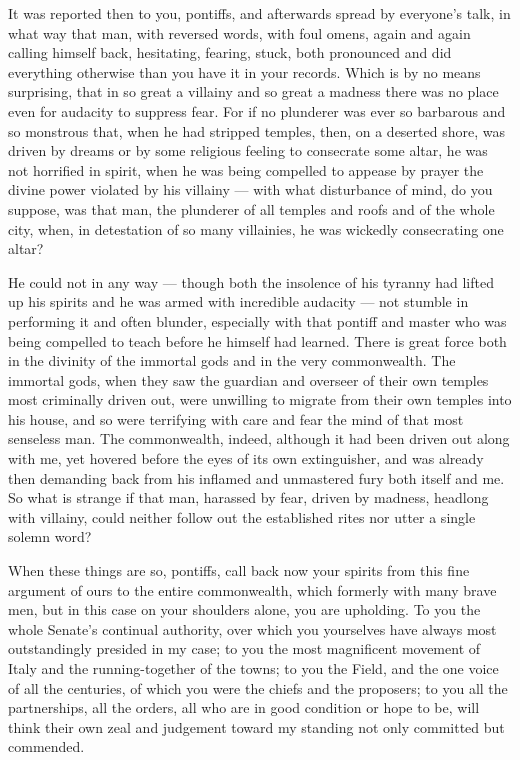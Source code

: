  It was reported then to you, pontiffs, and afterwards spread by everyone's talk, in what way that man, with reversed words, with foul omens, again and again calling himself back, hesitating, fearing, stuck, both pronounced and did everything otherwise than you have it in your records. Which is by no means surprising, that in so great a villainy and so great a madness there was no place even for audacity to suppress fear. For if no plunderer was ever so barbarous and so monstrous that, when he had stripped temples, then, on a deserted shore, was driven by dreams or by some religious feeling to consecrate some altar, he was not horrified in spirit, when he was being compelled to appease by prayer the divine power violated by his villainy --- with what disturbance of mind, do you suppose, was that man, the plunderer of all temples and roofs and of the whole city, when, in detestation of so many villainies, he was wickedly consecrating one altar?

 He could not in any way --- though both the insolence of his tyranny had lifted up his spirits and he was armed with incredible audacity --- not stumble in performing it and often blunder, especially with that pontiff and master who was being compelled to teach before he himself had learned. There is great force both in the divinity of the immortal gods and in the very commonwealth. The immortal gods, when they saw the guardian and overseer of their own temples most criminally driven out, were unwilling to migrate from their own temples into his house, and so were terrifying with care and fear the mind of that most senseless man. The commonwealth, indeed, although it had been driven out along with me, yet hovered before the eyes of its own extinguisher, and was already then demanding back from his inflamed and unmastered fury both itself and me. So what is strange if that man, harassed by fear, driven by madness, headlong with villainy, could neither follow out the established rites nor utter a single solemn word?

 When these things are so, pontiffs, call back now your spirits from this fine argument of ours to the entire commonwealth, which formerly with many brave men, but in this case on your shoulders alone, you are upholding. To you the whole Senate's continual authority, over which you yourselves have always most outstandingly presided in my case; to you the most magnificent movement of Italy and the running-together of the towns; to you the Field, and the one voice of all the centuries, of which you were the chiefs and the proposers; to you all the partnerships, all the orders, all who are in good condition or hope to be, will think their own zeal and judgement toward my standing not only committed but commended.

